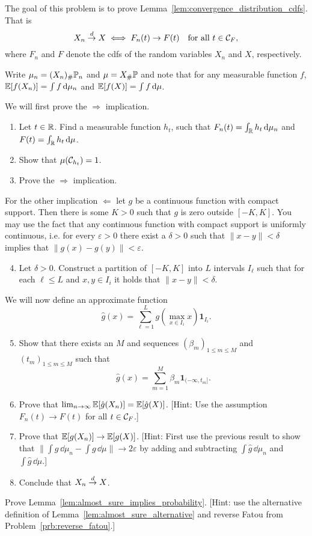 \begin{problem}\label{prb:convergence_distribution}
The goal of this problem is to prove Lemma~\ref{lem:convergence_distribution_cdfs}. That is
\[
	X_n \stackrel{d}{\rightarrow} X \iff F_n(t) \to F(t) \quad \text{for all } t \in \mathcal C_F,
\]
where $F_n$ and $F$ denote the cdfs of the random variables $X_n$ and $X$, respectively.

Write $\mu_n = (X_n)_\# \mathbb P_n$ and $\mu = X_\# \mathbb P$ and note that for any measurable function $f$, $\mathbb E[f(X_n)] = \int f \, \mathrm{d} \mu_n$ and $\mathbb E[f(X)] = \int f \, \mathrm{d} \mu$.

We will first prove the $\Rightarrow$ implication. 
\begin{enumerate}[label={(\alph*)}]
\item Let $t \in \mathbb R$. Find a measurable function $h_t$, such that $F_n(t) = \int_{\mathbb R} h_t \, \mathrm{d} \mu_n$ and $F(t) = \int_{\mathbb R} h_t \, \mathrm{d} \mu$.
\item Show that $\mu(\mathcal C_{h_t}) = 1$.
\item Prove the $\Rightarrow$ implication. 
\end{enumerate}

For the other implication $\Leftarrow$ let $g$ be a continuous function with compact support. Then there is some $K > 0$ such that $g$ is zero outside $[-K,K]$. You may use the fact that any continuous function with compact support is uniformly continuous, i.e. for every $\varepsilon > 0$ there exist a $\delta > 0$ such that $\|x-y\| < \delta$ implies that $\|g(x) - g(y)\| < \varepsilon$. 
\begin{enumerate}[label={(\alph*)}]
\setcounter{enumi}{3}
\item Let $\delta > 0$. Construct a partition of $[-K,K]$ into $L$ intervals $I_\ell$ such that for each $\ell \le L$ and $x, y \in I_i$ it holds that $\|x - y\| < \delta$.
\end{enumerate}

We will now define an approximate function
\[
	\hat{g}(x) = \sum_{\ell = 1}^L g(\max_{x \in I_i} x) \mathbf{1}_{I_i}.
\]

\begin{enumerate}[label={(\alph*)}]
\setcounter{enumi}{4}
\item Show that there exists an $M$ and sequences $(\beta_m)_{1 \le m \le M}$ and $(t_m)_{1 \le m \le M}$ such that
\[
	\hat{g}(x) = \sum_{m = 1}^M \beta_m \mathbf{1}_{(-\infty, t_m]}.
\]
\item Prove that $\lim_{n \to \infty} \mathbb E[\hat{g}(X_n)] = \mathbb E[\hat{g}(X)]$. [Hint: Use the assumption $F_n(t) \to F(t)$ for all $t \in \mathcal C_F$.]
\item Prove that $\mathbb E[g(X_n)] \to \mathbb E[g(X)]$. [Hint: First use the previous result to show that $\| \int g \, \dd \mu_n - \int g \, \dd \mu\| \to 2\varepsilon$ by adding and subtracting $\int \hat{g} \, \dd \mu_n$ and $\int \hat{g} \, \dd \mu$.]
\item Conclude that $X_n \stackrel{d}{\rightarrow} X$.
\end{enumerate}
\end{problem}

\begin{problem}\label{prb:almost_sure_implies_probability}
Prove Lemma~\ref{lem:almost_sure_implies_probability}. [Hint: use the alternative definition of Lemma~\ref{lem:almost_sure_alternative} and reverse Fatou from Problem~\ref{prb:reverse_fatou}.]
\end{problem}